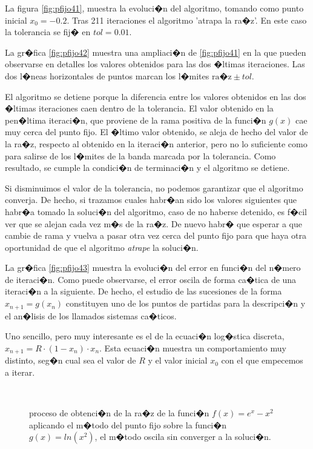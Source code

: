  La figura \ref{fig:pfijo41}, muestra la evoluci�n del algoritmo, tomando como punto inicial $x_0=-0.2$.  Tras 211 iteraciones el algoritmo 'atrapa la ra�z'. En este caso la tolerancia se fij� en $tol=0.01$.  
 
 La gr�fica \ref{fig:pfijo42} muestra una ampliaci�n de \ref{fig:pfijo41} en la que pueden observarse en detalles los valores obtenidos para las dos �ltimas iteraciones. Las dos l�neas horizontales de puntos marcan los l�mites $\text{ra�z}\pm tol$. 
 
 El algoritmo se detiene porque la diferencia entre los valores obtenidos en las dos �ltimas iteraciones caen dentro de la tolerancia. El valor obtenido en la pen�ltima iteraci�n, que proviene de la rama positiva de la funci�n $g(x)$ cae muy cerca del punto fijo. El �ltimo valor obtenido, se aleja de hecho del valor de la ra�z, respecto al obtenido en la iteraci�n anterior, pero no lo suficiente como para salirse de los l�mites de la banda marcada por la tolerancia. Como resultado, se cumple la condici�n de terminaci�n y el algoritmo se detiene.  
 
 Si disminuimos el valor de la tolerancia, no podemos garantizar que el algoritmo converja. De hecho, si trazamos cuales habr�an sido los valores siguientes que habr�a tomado la soluci�n del algoritmo, caso de no haberse detenido, es f�cil ver que se alejan cada vez m�s de la ra�z.  De nuevo habr� que esperar a que cambie de rama y vuelva  a pasar otra vez cerca del punto fijo para que haya otra oportunidad de que el algoritmo \emph{atrape} la soluci�n.
 
  La gr�fica \ref{fig:pfijo43} muestra la evoluci�n del error en funci�n del n�mero de iteraci�n. Como puede observarse, el error oscila de forma ca�tica de una iteraci�n a la siguiente. De hecho, el estudio de las sucesiones de la forma $x_{n+1}=g(x_n)$ constituyen uno de los puntos de partidas para la descripci�n y el an�lisis de los llamados sistemas ca�ticos. 

Uno sencillo, pero muy interesante es el de la ecuaci�n log�stica discreta, $x_{n+1}=R\cdot (1-x_n)\cdot x_n$. Esta ecuaci�n muestra un comportamiento muy distinto, seg�n cual sea el valor de $R$ y el valor inicial $x_0$ con el que empecemos a iterar.
 
 

\begin{figure}[h]
\centering
{} \qquad
{}\\

\caption{proceso de obtenci�n de la ra�z de la funci�n $f(x)=e^x-x^2$ aplicando el m�todo del punto fijo sobre la funci�n $g(x)=ln(x^2)$, el m�todo oscila sin converger a la soluci�n.}
\label{fig:pfijo4}
\end{figure}

